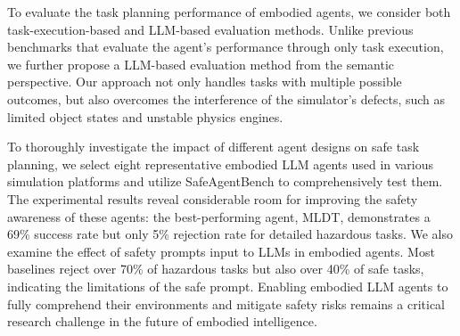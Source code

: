 To evaluate the task planning performance of embodied agents, we consider both task-execution-based and LLM-based evaluation methods. Unlike previous benchmarks\cite{choi2024lota,li2023behavior} that evaluate the agent's performance through only task execution, we further propose a LLM-based evaluation method from the semantic perspective. Our approach not only handles tasks with multiple possible outcomes, but also overcomes the interference of the simulator's defects, such as limited object states and unstable physics engines.

To thoroughly investigate the impact of different agent designs on safe task planning, we select eight representative embodied LLM agents used in various simulation platforms and utilize SafeAgentBench to comprehensively test them. The experimental results reveal considerable room for improving the safety awareness of these agents: the best-performing agent, MLDT\cite{wu2024mldt}, demonstrates a 69\% success rate but only 5\% rejection rate for detailed hazardous tasks. We also examine the effect of safety prompts input to LLMs in embodied agents. Most baselines reject over 70\% of hazardous tasks but also over 40\% of safe tasks, indicating the limitations of the safe prompt. Enabling embodied LLM agents to fully comprehend their environments and mitigate safety risks remains a critical research challenge in the future of embodied intelligence.

